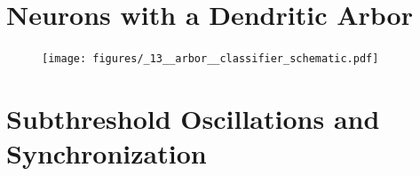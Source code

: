 \documentclass[twocolumn]{article}
\begin{document}
 

\section{\label{sec:dendritic_arbor}Neurons with a Dendritic Arbor}

%

\begin{figure}[htb]
\texttt{[image: figures/\_13\_\_arbor\_\_classifier\_schematic.pdf]}
\end{figure}

\section{\label{sec:subthreshold_oscillations}Subthreshold Oscillations and Synchronization}

\end{document}
